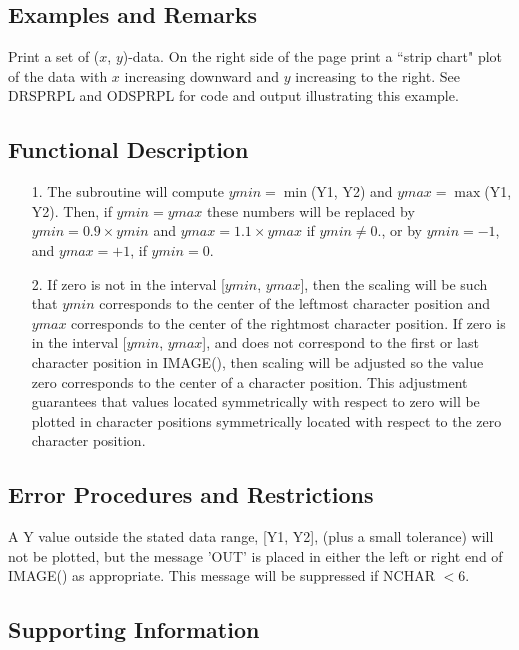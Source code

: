 \documentclass[twoside]{MATH77}
\begin{document}
\subsection{Examples and Remarks}

Print a set of ($x$, $y$)-data.  On the right side of the page print a
``strip chart" plot of the data with $x$ increasing downward and $y$
increasing to the right.  See DRSPRPL and ODSPRPL for code and output
illustrating this example.

\subsection{Functional Description}

\begin{itemize}
\item[1.] The subroutine will compute $ymin = \min$(Y1, Y2) and $ymax
= \max$(Y1, Y2).  Then, if $ymin = ymax$ these numbers will be
replaced by $ymin = 0.9 \times ymin$ and $ymax = 1.1 \times ymax$
if $ymin \neq 0.$, or by $ymin = -1$, and $ymax = +1$, if $ymin = 0$.

\item[2.] If zero is not in the interval [$ymin$, $ymax$], then the
scaling will be such that $ymin$ corresponds to the center of the
leftmost character position and $ymax$ corresponds to the center of
the rightmost character position.  If zero is in the interval
[$ymin$, $ymax$], and does not correspond to the first or last
character position in IMAGE(), then scaling will be adjusted so the
value zero corresponds to the center of a character position.  This
adjustment guarantees that values located symmetrically with respect
to zero will be plotted in character positions symmetrically located
with respect to the zero character position.
\end{itemize}

\subsection{Error Procedures and Restrictions}

A Y value outside the stated data range, [Y1, Y2], (plus a small tolerance)
will not be plotted, but the message 'OUT' is placed in either the left or
right end of IMAGE() as appropriate.  This message will be suppressed if
NCHAR $< 6.$
\enlargethispage*{40pt}
\subsection{Supporting Information}
\end{document}
